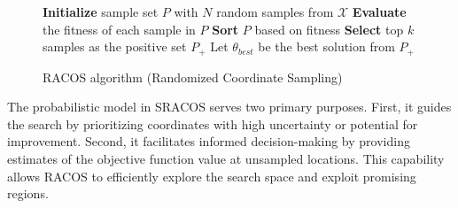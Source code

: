 \begin{figure}[!ht]
    \centering
    \begin{minipage}{1.0\linewidth}
        \begin{algorithm}[H]
            \SetAlgoLined
            \BlankLine
            
            \textbf{Initialize} sample set $P$ with $N$ random samples from $\mathcal{X}$\;
            \textbf{Evaluate} the fitness of each sample in $P$\;
            \textbf{Sort} $P$ based on fitness\;
            \textbf{Select} top $k$ samples as the positive set $P_+$\;
            Let $\theta_{best}$ be the best solution from $P_+$\;
            \BlankLine
            
            \caption{RACOS algorithm (Randomized Coordinate Sampling)}
            \label{alg:racos}
        \end{algorithm}
\end{minipage}
\end{figure}

The probabilistic model in SRACOS serves two primary purposes. First, it guides the search by prioritizing coordinates with high uncertainty or potential for improvement. Second, it facilitates informed decision-making by providing estimates of the objective function value at unsampled locations. This capability allows RACOS to efficiently explore the search space and exploit promising regions.


